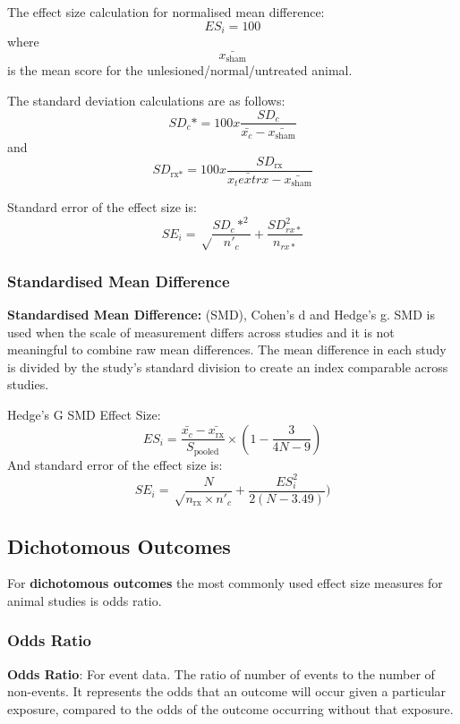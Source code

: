 \documentclass[
]{book}
\begin{document}
The effect size calculation for normalised mean difference:
\[ES_i= 100%
\] where \[\bar{x_\text{sham}} \] is the mean score for the unlesioned/normal/untreated animal.

The standard deviation calculations are as follows:
\[SD_c* = 100 x \frac {SD_c}{\bar{x_c} - \bar{x_\text{sham}}} \] and \[SD_\text{rx*} = 100 x \frac {SD_\text{rx}}{\bar{x_text{rx}} - \bar{x_\text{sham}}}\]

Standard error of the effect size is:
\[SE_i = \sqrt \frac{SD_c*^2}{n'_c} + \frac {SD_{rx*}^2}{n_{rx*}} \]

\hypertarget{standardised-mean-difference}{%
\subsubsection{Standardised Mean Difference}\label{standardised-mean-difference}}

\textbf{Standardised Mean Difference:} (SMD), Cohen's d and Hedge's g. SMD is used when the scale of measurement differs across studies and it is not meaningful to combine raw mean differences. The mean difference in each study is divided by the study's standard division to create an index comparable across studies.

Hedge's G SMD Effect Size:
\[ES_i = \frac {\bar{x_c} - \bar{x_\text{rx}}}{S_{\text{pooled}}} \times (1 - \frac{3}{4N - 9})  \]
And standard error of the effect size is:
\[ SE_i = \sqrt \frac{N}{n_{\text{rx}} \times n'_c} + \frac{ES_i^2}{2(N - 3.49)})\]

\hypertarget{dichotomous-outcomes}{%
\subsection{Dichotomous Outcomes}\label{dichotomous-outcomes}}

For \textbf{dichotomous outcomes} the most commonly used effect size measures for animal studies is odds ratio.

\hypertarget{odds-ratio}{%
\subsubsection{Odds Ratio}\label{odds-ratio}}

\textbf{Odds Ratio}: For event data. The ratio of number of events to the number of non-events. It represents the odds that an outcome will occur given a particular exposure, compared to the odds of the outcome occurring without that exposure.
\end{document}
